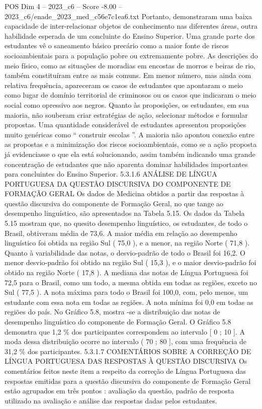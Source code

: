 \begin{textsample}{POS Dim 4 – 2023\_c6 – Score -8.00 – 2023\_c6/enade\_2023\_med\_c56e7c1ea6.txt}
Portanto, demonstraram uma baixa capacidade de inter-relacionar objetos de conhecimento nas diferentes áreas, outra habilidade esperada de um concluinte do Ensino Superior.
Uma grande parte dos estudantes vê o saneamento básico precário como a maior fonte de riscos socioambientais para a população pobre ou extremamente pobre.
As descrições do meio físico, como as situações de moradias em encostas de morros e beiras de rio, também constituíram entre as mais comuns.
Em menor número, mas ainda com relativa frequência, apareceram os casos de estudantes que apontaram o meio como lugar de domínio territorial de criminosos ou os casos que indicaram o meio social como opressivo aos negros.
Quanto às proposições, os estudantes, em sua maioria, não souberam criar estratégias de ação, selecionar métodos e formular propostas.
Uma quantidade considerável de estudantes apresentou proposições muito genéricas como “ construir escolas ”.
A maioria não apontou conexão entre as propostas e a minimização dos riscos socioambientais, como se a ação proposta já evidenciasse o que ela está solucionando, assim também indicando uma grande concentração de estudantes que não aparenta dominar habilidades importantes para concluintes do Ensino Superior. 5.3.1.6 ANÁLISE DE LÍNGUA PORTUGUESA DA QUESTÃO DISCURSIVA DO COMPONENTE DE FORMAÇÃO GERAL Os dados de Medicina obtidos a partir das respostas à questão discursiva do componente de Formação Geral, no que tange ao desempenho linguístico, são apresentados na Tabela 5.15.
Os dados da Tabela 5.15 mostram que, no quesito desempenho linguístico, os estudantes, de todo o Brasil, obtiveram média de 73,6.
A maior média em relação ao desempenho linguístico foi obtida na região Sul ( 75,0 ), e a menor, na região Norte ( 71,8 ).
Quanto à variabilidade das notas, o desvio-padrão de todo o Brasil foi 16,2.
O menor desvio-padrão foi obtido na região Sul ( 15,3 ), e o maior desvio-padrão foi obtido na região Norte ( 17,8 ).
A mediana das notas de Língua Portuguesa foi 72,5 para o Brasil, como um todo, a mesma obtida em todas as regiões, exceto no Sul ( 77,5 ).
A nota máxima para todo o Brasil foi 100,0, com, pelo menos, um estudante com essa nota em todas as regiões.
A nota mínima foi 0,0 em todas as regiões do país.
No Gráfico 5.8, mostra -se a distribuição das notas de desempenho linguístico do componente de Formação Geral.
O Gráfico 5.8 demonstra que 1,2 \% dos participantes correspondem ao intervalo [ 0 ; 10 ].
A moda dessa distribuição ocorre no intervalo ( 70 ; 80 ], com uma frequência de 31,2 \% dos participantes. 5.3.1.7 COMENTÁRIOS SOBRE A CORREÇÃO DE LÍNGUA PORTUGUESA DAS RESPOSTAS À QUESTÃO DISCURSIVA Os comentários feitos neste item a respeito da correção de Língua Portuguesa das respostas emitidas para a questão discursiva do componente de Formação Geral estão agrupados em três pontos : avaliação da questão, padrão de resposta utilizado na avaliação e análise das respostas dadas pelos estudantes.

\end{textsample}
